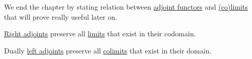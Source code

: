 \documentclass[../../main]{subfiles}
\begin{document}
We end the chapter by stating relation between \hyperref[def:adjoint-functors]{adjoint functors} and \hyperref[def:categorical-limit]{(co)limits} that will prove really useful later on.
\begin{theorem}\label{thm:adjoints-preserve-limits}
  \hyperref[def:adjoint-functors]{Right adjoints} preserve all \hyperref[def:categorical-limit]{limits} that exist in their codomain.
  
  Dually \hyperref[def:adjoint-functors]{left adjoints} preserve all \hyperref[def:categorical-colimit]{colimits} that exist in their domain.
\end{theorem}
\end{document}
